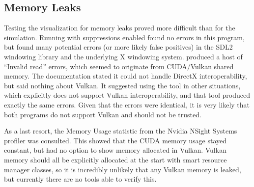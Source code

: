 \subsection{Memory Leaks}\label{sec:Results:Viz:Memory}
Testing the visualization for memory leaks proved more difficult than for the simulation.
Running  with suppressions enabled found no errors in this program, but found many potential errors (or more likely false positives) in the SDL2 windowing library and the underlying X windowing system.
 produced a host of ``Invalid read'' errors, which seemed to originate from CUDA/Vulkan shared memory.
The documentation stated it could not handle DirectX interoperability\cite{NvidiaCudaMemcheckIssues}, but said nothing about Vulkan.
It suggested using the  tool in other situations, which explicitly does not support Vulkan interoperability\cite{NvidiaComputeSanitizerRelease}, and that tool produced exactly the same errors.
Given that the errors were identical, it is very likely that both programs do not support Vulkan and should not be trusted.

As a last resort, the Memory Usage statistic from the Nvidia NSight Systems profiler was consulted.
This showed that the CUDA memory usage stayed constant, but had no option to show memory allocated in Vulkan.
Vulkan memory should all be explicitly allocated at the start with smart resource manager classes, so it is incredibly unlikely that any Vulkan memory is leaked, but currently there are no tools able to verify this.